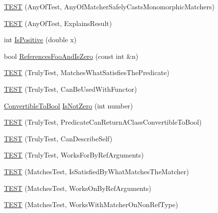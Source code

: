 \begin{DoxyCompactItemize}
\item 
\hyperlink{namespacetesting_1_1gmock__matchers__test_a8fb1598253450afeb0440682cd23999e}{T\+E\+ST} (Any\+Of\+Test, Any\+Of\+Matcher\+Safely\+Casts\+Monomorphic\+Matchers)
\item 
\hyperlink{namespacetesting_1_1gmock__matchers__test_ad4c09014fce6029575e2c337cde85bdf}{T\+E\+ST} (Any\+Of\+Test, Explains\+Result)
\item 
int \hyperlink{namespacetesting_1_1gmock__matchers__test_a70e728cf67d0224c3ebb9eb8959cc39d}{Is\+Positive} (double x)
\item 
bool \hyperlink{namespacetesting_1_1gmock__matchers__test_abdce9daf2e3d3721d68f76680129f03b}{References\+Foo\+And\+Is\+Zero} (const int \&n)
\item 
\hyperlink{namespacetesting_1_1gmock__matchers__test_ab7761562a8ffea67a485f3f649f6430a}{T\+E\+ST} (Truly\+Test, Matches\+What\+Satisfies\+The\+Predicate)
\item 
\hyperlink{namespacetesting_1_1gmock__matchers__test_ab3e259f3ae45e199474d7c6d554852f0}{T\+E\+ST} (Truly\+Test, Can\+Be\+Used\+With\+Functor)
\item 
\hyperlink{classtesting_1_1gmock__matchers__test_1_1_convertible_to_bool}{Convertible\+To\+Bool} \hyperlink{namespacetesting_1_1gmock__matchers__test_a248045bc57c8bad87b7d185b5c292f60}{Is\+Not\+Zero} (int number)
\item 
\hyperlink{namespacetesting_1_1gmock__matchers__test_a24529fd7834d272009af74106422fe54}{T\+E\+ST} (Truly\+Test, Predicate\+Can\+Return\+A\+Class\+Convertible\+To\+Bool)
\item 
\hyperlink{namespacetesting_1_1gmock__matchers__test_af474a9719e614d521c71bdf7c39f6a7a}{T\+E\+ST} (Truly\+Test, Can\+Describe\+Self)
\item 
\hyperlink{namespacetesting_1_1gmock__matchers__test_ae702d436c52bd37fe3e8d405d7e6a691}{T\+E\+ST} (Truly\+Test, Works\+For\+By\+Ref\+Arguments)
\item 
\hyperlink{namespacetesting_1_1gmock__matchers__test_a6617484cbb644af9882fc5d853112aae}{T\+E\+ST} (Matches\+Test, Is\+Satisfied\+By\+What\+Matches\+The\+Matcher)
\item 
\hyperlink{namespacetesting_1_1gmock__matchers__test_a6cfa391c9035262ccdc0d8f59e037b4d}{T\+E\+ST} (Matches\+Test, Works\+On\+By\+Ref\+Arguments)
\item 
\hyperlink{namespacetesting_1_1gmock__matchers__test_a9fd734ae5afb64a7285503bc0870c255}{T\+E\+ST} (Matches\+Test, Works\+With\+Matcher\+On\+Non\+Ref\+Type)
\item 

\end{DoxyCompactItemize}
